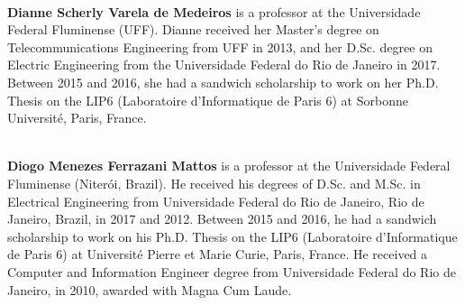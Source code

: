\documentclass[a4paper,11pt]{article}
\begin{document}
~\\
\textbf{Dianne Scherly Varela de Medeiros} is a professor at the Universidade Federal Fluminense (UFF). Dianne received her Master’s degree on Telecommunications Engineering from UFF in 2013, and her D.Sc. degree on Electric Engineering from the Universidade Federal do Rio de Janeiro in 2017. Between 2015 and 2016, she had a sandwich scholarship to work on her Ph.D. Thesis on the LIP6 (Laboratoire d’Informatique de Paris 6) at Sorbonne Université, Paris, France.

\vspace{1cm}

~\\
\textbf{Diogo Menezes Ferrazani Mattos} is a professor at the Universidade Federal Fluminense (Niterói, Brazil). He received his degrees of D.Sc. and M.Sc. in Electrical Engineering from Universidade Federal do Rio de Janeiro, Rio de Janeiro, Brazil, in 2017 and 2012. Between 2015 and 2016, he had a sandwich scholarship to work on his Ph.D. Thesis on the LIP6 (Laboratoire d’Informatique de Paris 6) at Université Pierre et Marie Curie, Paris, France. He received a Computer and Information Engineer degree from Universidade Federal do Rio de Janeiro, in 2010, awarded with Magna Cum Laude.
\end{document}
